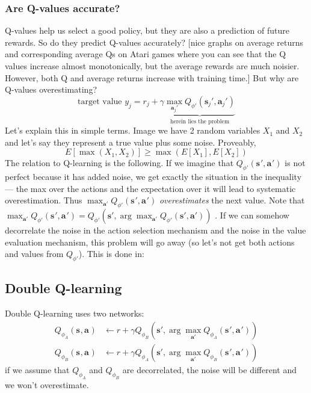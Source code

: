 \documentclass{report}
\newcommand{\argmax}{\arg\!\max}
\begin{document}
\subsubsection{Are Q-values accurate?}
Q-values help us select a good policy, but they are also a prediction of future rewards.
So do they predict Q-values accurately?
[nice graphs on average returns and corresponding average Qs on Atari games where you can see that the Q values increase almost monotonically,
but the average rewards are much noisier. However, both Q and average returns increase with training time.]
But why are Q-values overestimating?
\begin{equation}
		\text{target value } y_j = r_j + \gamma \underbrace{ \max_{\bm{a}_j'} Q_{\phi'}(\bm{s}_{j}', \bm{a}_{j}')}_{\text{herein lies the problem}}
\end{equation}
Let's explain this in simple terms.
Image we have 2 random variables $X_1$ and $X_2$ and let's say they represent a true value plus some noise.
Proveably,
\begin{equation}
		E \left[ \max (X_1, X_2) \right] \geq \max	\left( E[X_1], E[X_2] \right) 
\end{equation}
The relation to Q-learning is the following.
If we imagine that $Q_{\phi'}(\bm{s}_{}', \bm{a}_{}')$ is not perfect because it has added noise,
we get exactly the situation in the inequality --- the max over the actions and the expectation
over it will lead to systematic overestimation.
Thus $\max_{\bm{a}'} Q_{\phi'}(\bm{s}_{}', \bm{a}_{}')$ \textit{overestimates} the next value.
Note that $\max_{\bm{a}'} Q_{\phi'}(\bm{s}_{}', \bm{a}_{}') = Q_{\phi'} (\bm{s}', \argmax_{\bm{a}'}Q_{\phi'}(\bm{s}', \bm{a}'))$ .
If we can somehow decorrelate the noise in the action selection mechanism and the noise in the value evaluation
mechanism, this problem will go away (so let's not get both actions and values from $Q_{\phi'}$).
This is done in:

\subsection{Double Q-learning}
Double Q-learning uses two networks:
\begin{align}
		Q_{\phi_A}(\bm{s}_{}, \bm{a}_{}) &\leftarrow r + \gamma Q_{\phi_B} \left( \bm{s}', \argmax_{\bm{a}'}Q_{\phi_A}(\bm{s}_{}', \bm{a}_{}') \right) \\
		Q_{\phi_B}(\bm{s}_{}, \bm{a}_{}) &\leftarrow r + \gamma Q_{\phi_A} \left( \bm{s}', \argmax_{\bm{a}'}Q_{\phi_B}(\bm{s}_{}', \bm{a}_{}') \right) 
\end{align}
if we assume that $Q_{\phi_A}$ and $Q_{\phi_B}$ are decorrelated, the noise will be different and we won't overestimate.
\end{document}
